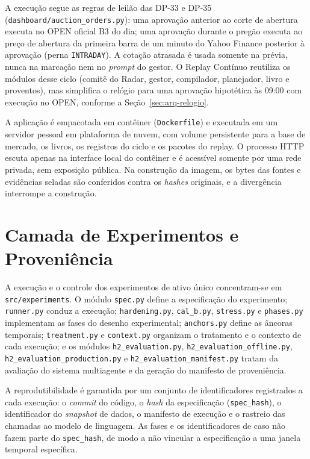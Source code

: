 \documentclass{eic-bcc-tcc}
\begin{document}
A execução segue as regras de leilão das DP-33 e DP-35 (\texttt{dashboard/auction\_orders.py}): uma aprovação anterior ao corte de abertura executa no OPEN oficial B3 do dia; uma aprovação durante o pregão executa ao preço de abertura da primeira barra de um minuto do Yahoo Finance posterior à aprovação (perna \texttt{INTRADAY}). A cotação atrasada é usada somente na prévia, nunca na marcação nem no \textit{prompt} do gestor. O Replay Contínuo reutiliza os módulos desse ciclo (comitê do Radar, gestor, compilador, planejador, livro e proventos), mas simplifica o relógio para uma aprovação hipotética às 09:00 com execução no OPEN, conforme a Seção~\ref{sec:arq-relogio}.

A aplicação é empacotada em contêiner (\texttt{Dockerfile}) e executada em um servidor pessoal em plataforma de nuvem, com volume persistente para a base de mercado, os livros, os registros do ciclo e os pacotes do replay. O processo HTTP escuta apenas na interface local do contêiner e é acessível somente por uma rede privada, sem exposição pública. Na construção da imagem, os bytes das fontes e evidências seladas são conferidos contra os \textit{hashes} originais, e a divergência interrompe a construção.

\section{Camada de Experimentos e Proveniência}
\label{sec:arq-experimentos}

A execução e o controle dos experimentos de ativo único concentram-se em \texttt{src/experiments}. O módulo \texttt{spec.py} define a especificação do experimento; \texttt{runner.py} conduz a execução; \texttt{hardening.py}, \texttt{cal\_b.py}, \texttt{stress.py} e \texttt{phases.py} implementam as fases do desenho experimental; \texttt{anchors.py} define as âncoras temporais; \texttt{treatment.py} e \texttt{context.py} organizam o tratamento e o contexto de cada execução; e os módulos \texttt{h2\_evaluation.py}, \texttt{h2\_evaluation\_offline.py}, \texttt{h2\_evaluation\_production.py} e \texttt{h2\_evaluation\_manifest.py} tratam da avaliação do sistema multiagente e da geração do manifesto de proveniência.

A reprodutibilidade é garantida por um conjunto de identificadores registrados a cada execução: o \textit{commit} do código, o \textit{hash} da especificação (\texttt{spec\_hash}), o identificador do \textit{snapshot} de dados, o manifesto de execução e o rastreio das chamadas ao modelo de linguagem. As fases e os identificadores de caso não fazem parte do \texttt{spec\_hash}, de modo a não vincular a especificação a uma janela temporal específica.
\end{document}

